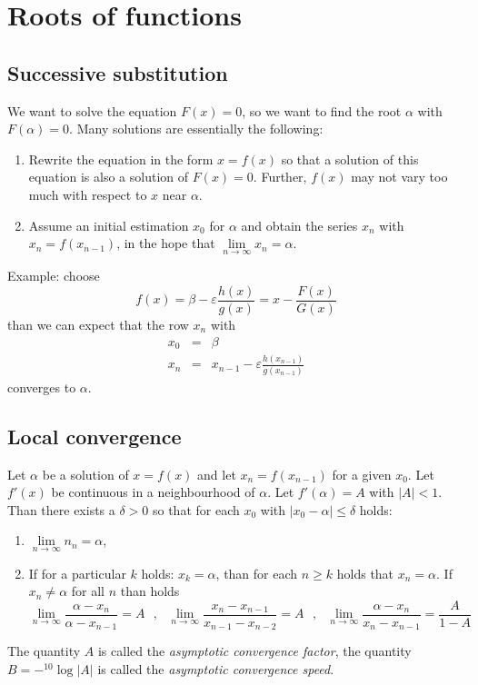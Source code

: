 \documentclass[a4paper,fancyheadings,twoside]{report}
\begin{document}
\section{Roots of functions}
\subsection{Successive substitution}
We want to solve the equation $F(x)=0$, so we want to find the root
$\alpha$ with $F(\alpha)=0$.
\npar
Many solutions are essentially the following:
\begin{enumerate}
\item Rewrite the equation in the form $x=f(x)$ so that a solution of this
      equation is also a solution of $F(x)=0$. Further, $f(x)$ may not vary
      too much with respect to $x$ near $\alpha$.
\item Assume an initial estimation $x_0$ for $\alpha$ and obtain the series
      $x_n$ with $x_n=f(x_{n-1})$, in the hope that $\lim\limits_{n\rightarrow\infty}x_n=\alpha$.
\end{enumerate}
Example: choose
\[
f(x)=\beta-\varepsilon\frac{h(x)}{g(x)}=x-\frac{F(x)}{G(x)}
\]
than we can expect that the row $x_n$ with
\begin{eqnarray*}
x_0&=&\beta\\
x_n&=&x_{n-1}-\varepsilon\frac{h(x_{n-1})}{g(x_{n-1})}
\end{eqnarray*}
converges to $\alpha$.

\subsection{Local convergence}
Let $\alpha$ be a solution of $x=f(x)$ and let $x_n=f(x_{n-1})$ for a given
$x_0$. Let $f'(x)$ be continuous in a neighbourhood of $\alpha$. Let
$f'(\alpha)=A$ with $|A|<1$. Than there exists a $\delta>0$ so that for each
$x_0$ with $|x_0-\alpha|\leq\delta$ holds:
\begin{enumerate}
\item $\lim\limits_{n\rightarrow\infty}n_n=\alpha$,
\item If for a particular $k$ holds: $x_k=\alpha$, than for each $n\geq k$
      holds that $x_n=\alpha$. If $x_n\neq\alpha$ for all $n$ than holds
\[
\lim_{n\rightarrow\infty}\frac{\alpha-x_n}{\alpha-x_{n-1}}=A~~~,~~~
\lim_{n\rightarrow\infty}\frac{x_n-x_{n-1}}{x_{n-1}-x_{n-2}}=A~~~,~~~
\lim_{n\rightarrow\infty}\frac{\alpha-x_n}{x_n-x_{n-1}}=\frac{A}{1-A}
\]
\end{enumerate}
The quantity $A$ is called the {\it asymptotic convergence factor}, the
quantity $B=-{}^{10}\log|A|$ is called the {\it asymptotic convergence speed}.
\end{document}
